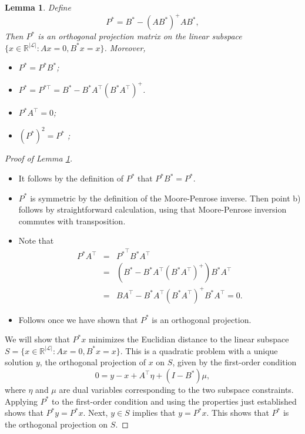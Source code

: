 \documentclass[a4paper,11pt]{article}
\newtheorem{lemma}{Lemma}
\newcommand{\R}{\mathbb{R}}
\begin{document}
\begin{lemma}\label{lem:P_hat}
Define 
\begin{equation*}
P^*=B^*-(AB^*)^+ A B^*,
\end{equation*}%
Then ${P^*}$ is an orthogonal projection matrix on the linear subspace $\{x\in \R^{|\mathcal{L}|}:Ax=0,B^* x=x\}$. Moreover, 
\begin{itemize}
    \item[a)] ${P^*}={P^*}{B^*}$;
    \item[b)] $ P^* =P^{* \top} =B^{*} -B^* A^\top \left( B^*     A^\top\right)^+$.
    \item[c)]${P^*}A^{\top }=0$;
    \item[d)] $ (P^*)^2 =P^*$ ;
\end{itemize}
\end{lemma}

\begin{proof}[Proof of Lemma \ref{lem:P_hat}]                \;

\begin{itemize}
    \item[a)] It follows by the definition of $P^*$ that $ P^* B^* =P^* $.
    \item[b)]  ${P^*}$ is symmetric by the definition of the Moore-Penrose inverse. Then point b) follows by straightforward calculation, using that Moore-Penrose inversion commutes with transposition.  
    \item[c)] Note that 
    \begin{eqnarray*}
        {P^*}A^{\top } &=& {P^*}^\top B^* A^{\top } \\
        &=&    \left(B^* -B^* A^\top \left( B^*      A^\top\right)^+\right)B^* A^{\top }   \\
        &=& B A^{\top } -B^* A^\top \left( B^*    A^\top\right)^+B^* A^{\top } =0.
    \end{eqnarray*}
    
    \item[d)] Follows once we have shown that $ P^*$ is an orthogonal projection.
\end{itemize}
 
We will show that $ P^* x$ minimizes the Euclidian distance to the linear subspace $S=\{x\in \R^{|\mathcal{L}|}:Ax=0,B^* x=x\}$. This is a quadratic problem with a unique solution $y$, the orthogonal projection of $x$ on $S$, given by the first-order condition
\[
0 = y - x + A^\top \eta + (I- B^*)\mu,
\]
where $\eta$ and $\mu$ are dual variables corresponding to the two subspace constraints. Applying $ P^*$ to the first-order condition and using the properties just established shows that $ P^* y =P^* x$. Next, $y\in S$ implies that $y =P^* x$. This shows that $P^*$ is the orthogonal projection on $S$.
\end{proof}
\end{document}
